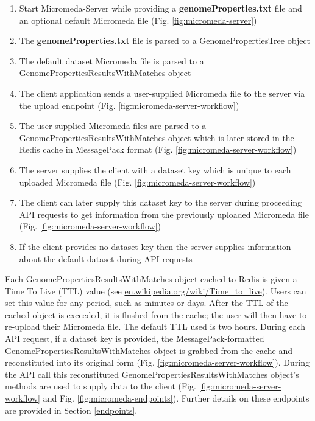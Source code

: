 \begin{enumerate}
  \item Start Micromeda-Server while providing a \textbf{genomeProperties.txt} file and an optional default Micromeda file (Fig. \ref{fig:micromeda-server})
  \item The \textbf{genomeProperties.txt} file is parsed to a GenomePropertiesTree object
  \item The default dataset Micromeda file is parsed to a GenomePropertiesResultsWithMatches object  
  \item The client application sends a user-supplied Micromeda file to the server via the upload endpoint (Fig. \ref{fig:micromeda-server-workflow})
  \item The user-supplied Micromeda files are parsed to a GenomePropertiesResultsWithMatches object which is later stored in the Redis cache in MessagePack format (Fig. \ref{fig:micromeda-server-workflow})
  \item The server supplies the client with a dataset key which is unique to each uploaded Micromeda file (Fig. \ref{fig:micromeda-server-workflow})
  \item The client can later supply this dataset key to the server during proceeding API requests to get information from the previously uploaded Micromeda file (Fig. \ref{fig:micromeda-server-workflow})
  \item If the client provides no dataset key then the server supplies information about the default dataset during API requests
\end{enumerate}

Each GenomePropertiesResultsWithMatches object cached to Redis is given a Time To Live (TTL) value \cite{gwertzman1996world} (see \href{en.wikipedia.org/wiki/Time\_to\_live}{en.wikipedia.org/wiki/Time\_to\_live}). Users can set this value for any period, such as minutes or days. After the TTL of the cached object is exceeded, it is flushed from the cache; the user will then have to re-upload their Micromeda file. The default TTL used is two hours. During each API request, if a dataset key is provided, the MessagePack-formatted GenomePropertiesResultsWithMatches object is grabbed from the cache and reconstituted into its original form (Fig. \ref{fig:micromeda-server-workflow}). During the API call this reconstituted GenomePropertiesResultsWithMatches object's methods are used to supply data to the client  (Fig. \ref{fig:micromeda-server-workflow} and Fig. \ref{fig:micromeda-endpoints}). Further details on these endpoints are provided in Section \ref{endpoints}.

